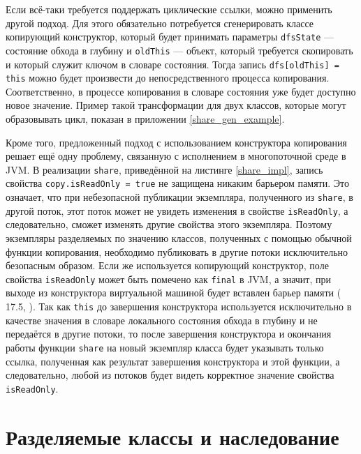 \documentclass[specification,annotation,times]{itmo-student-thesis}
\begin{document}
Если всё-таки требуется поддержать циклические ссылки, можно применить другой подход.
Для этого обязательно потребуется сгенерировать классе копирующий конструктор, который будет принимать параметры \texttt{dfsState} --- состояние обхода в глубину и \texttt{oldThis} --- объект, который требуется скопировать и который служит ключом в словаре состояния.
Тогда запись \texttt{dfs[oldThis] = this} можно будет произвести до непосредственного процесса копирования. Соответственно, в процессе копирования в словаре состояния уже будет доступно новое значение.
Пример такой трансформации для двух классов, которые могут образовывать цикл, показан в приложении \ref{share_gen_example}.


Кроме того, предложенный подход с использованием конструктора копирования решает ещё одну проблему, связанную с исполнением в многопоточной среде в JVM.
В реализации \texttt{share}, приведённой на листинге \ref{share_impl}, запись свойства \texttt{copy.isReadOnly = true} не защищена никаким барьером памяти.
Это означает, что при небезопасной публикации экземпляра, полученного из \texttt{share}, в другой поток, этот поток может не увидеть изменения в свойстве \texttt{isReadOnly}, а следовательно, сможет изменять другие свойства этого экземпляра.
Поэтому экземпляры разделяемых по значению классов, полученных с помощью обычной функции копирования, необходимо публиковать в другие потоки исключительно безопасным образом.
Если же используется копирующий конструктор, поле свойства \texttt{isReadOnly} может быть помечено как \texttt{final} в JVM, а значит,
при выходе из конструктора виртуальной машиной будет вставлен барьер памяти (\cite{jvm8-spec} 17.5, \cite{shipilev-final}).
Так как \texttt{this} до завершения конструктора используется исключительно в качестве значения в словаре локального состояния обхода в глубину и не передаётся в другие потоки, то после завершения конструктора и окончания работы функции \texttt{share} на новый экземпляр класса будет указывать только ссылка, полученная как результат завершения конструктора и этой функции, а следовательно, любой из потоков будет видеть корректное значение свойства \texttt{isReadOnly}.

\section{Разделяемые классы и наследование}\label{inheritance}
\end{document}
